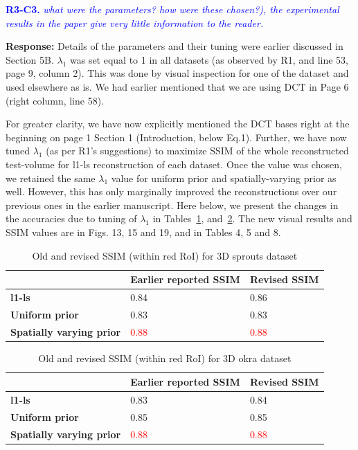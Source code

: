 \documentclass{article}
\begin{document}
\textcolor{blue}{\textbf{R3-C3.}\textit{ what were the parameters? how were these chosen?), the experimental results in the paper give very little information to the reader.}}

\textbf{ Response:} Details of the parameters and their tuning were earlier discussed in Section 5B. $\lambda_1$ was set equal to 1 in all datasets (as observed by R1, and line 53, page 9, column 2).  This was done by visual inspection for one of the dataset and used elsewhere as is. We had earlier mentioned that we are using DCT in Page 6 (right column, line 58). 

For greater clarity, we have now explicitly mentioned the DCT bases right at the beginning on page 1 Section 1 (Introduction, below Eq.1).  Further, we have now tuned $\lambda_1$ (as per R1's suggestions) to maximize SSIM of the whole reconstructed test-volume for l1-ls reconstruction of each dataset. Once the value was chosen, we retained the same $\lambda_1$ value for uniform prior and spatially-varying prior as well. However, this has only marginally improved the reconstructions over our previous ones in the earlier manuscript. Here below, we present the changes in the accuracies due to tuning of $\lambda_1$ in Tables~\ref{tab:sprouts_revised_ssim}, and~\ref{tab:okra_revised_ssim}. The new visual results and SSIM values are in Figs. 13, 15 and 19, and in Tables 4, 5 and 8. 


\begin{table}[!h]
  \centering
  \caption{Old and revised SSIM (within red RoI) for 3D sprouts dataset}
  \label{tab:sprouts_revised_ssim}
\begin{tabular}{|l|l|l|}
\hline
 & \textbf{Earlier reported SSIM} & \textbf{Revised SSIM} \\ \hline
\textbf{l1-ls} & 0.84 & 0.86 \\ \hline
\textbf{Uniform prior} & 0.83 & 0.83 \\ \hline
\textbf{Spatially varying prior} & \textcolor{red}{0.88} & \textcolor{red}{0.88} \\ \hline
\end{tabular}
\end{table}


\begin{table}[!h]
  \centering
  \caption{Old and revised SSIM (within red RoI) for 3D okra dataset}
  \label{tab:okra_revised_ssim}
\begin{tabular}{|l|l|l|}
\hline
 & \textbf{Earlier reported SSIM} & \textbf{Revised SSIM} \\ \hline
\textbf{l1-ls} & 0.83 & 0.84 \\ \hline
\textbf{Uniform prior} & 0.85 & 0.85 \\ \hline
\textbf{Spatially varying prior} & \textcolor{red}{0.88} & \textcolor{red}{0.88} \\ \hline
\end{tabular}
\end{table}
\end{document}
